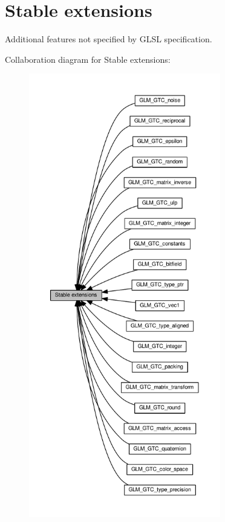 \hypertarget{group__gtc}{}\section{Stable extensions}
\label{group__gtc}


Additional features not specified by G\+L\+SL specification.  


Collaboration diagram for Stable extensions\+:
\nopagebreak
\begin{figure}[H]
\begin{center}
\leavevmode
\includegraphics[height=550pt]{d1/d1d/group__gtc}
\end{center}
\end{figure}

